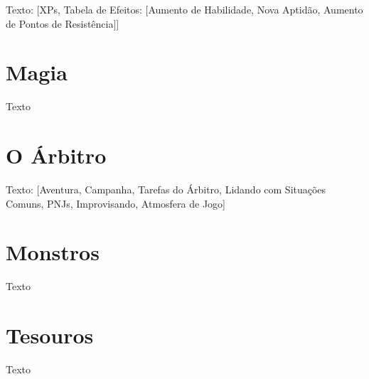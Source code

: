 \documentclass[a4paper, twocolumn, 10pt]{book}
\begin{document}
Texto: [XPs, Tabela de Efeitos: [Aumento de Habilidade, Nova Aptidão, Aumento de Pontos de Resistência]]

\chapter{Magia}

Texto

\chapter{O Árbitro}

Texto: [Aventura, Campanha, Tarefas do Árbitro, Lidando com Situações Comuns, PNJs, Improvisando, Atmosfera de Jogo]

\chapter{Monstros}

Texto

\chapter{Tesouros}

Texto
\end{document}
